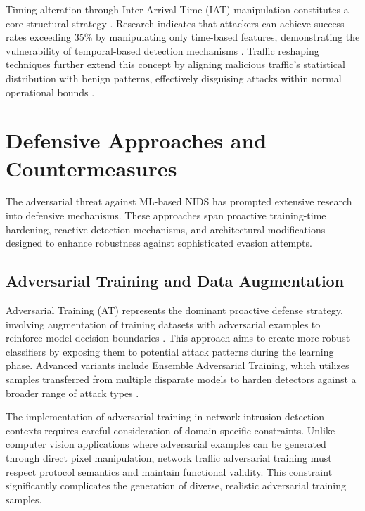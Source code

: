 Timing alteration through Inter-Arrival Time (IAT) manipulation constitutes a core structural strategy \cite{enhancing2023robustness}. Research indicates that attackers can achieve success rates exceeding 35\% by manipulating only time-based features, demonstrating the vulnerability of temporal-based detection mechanisms \cite{adversarial2023attacks}. Traffic reshaping techniques further extend this concept by aligning malicious traffic's statistical distribution with benign patterns, effectively disguising attacks within normal operational bounds \cite{adversarial2023ml}.

\section{Defensive Approaches and Countermeasures}
\label{sec:defensive_approaches}

The adversarial threat against ML-based NIDS has prompted extensive research into defensive mechanisms. These approaches span proactive training-time hardening, reactive detection mechanisms, and architectural modifications designed to enhance robustness against sophisticated evasion attempts.

\subsection{Adversarial Training and Data Augmentation}

Adversarial Training (AT) represents the dominant proactive defense strategy, involving augmentation of training datasets with adversarial examples to reinforce model decision boundaries \cite{evaluation2023adversarial}. This approach aims to create more robust classifiers by exposing them to potential attack patterns during the learning phase. Advanced variants include Ensemble Adversarial Training, which utilizes samples transferred from multiple disparate models to harden detectors against a broader range of attack types \cite{adversarial2023attacks}.

The implementation of adversarial training in network intrusion detection contexts requires careful consideration of domain-specific constraints. Unlike computer vision applications where adversarial examples can be generated through direct pixel manipulation, network traffic adversarial training must respect protocol semantics and maintain functional validity. This constraint significantly complicates the generation of diverse, realistic adversarial training samples.

